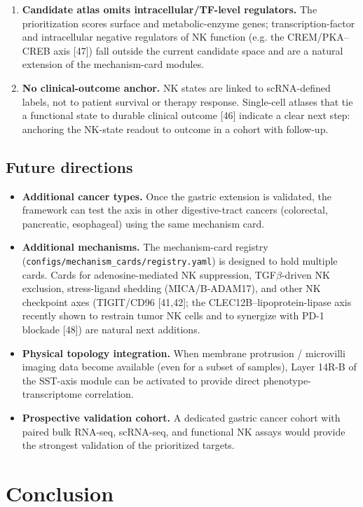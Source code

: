 \documentclass[modern,large,numbered,nocrop]{oup-authoring-template}
\begin{document}
\begin{enumerate}
\item \textbf{Candidate atlas omits intracellular/TF-level regulators.} The prioritization scores surface and metabolic-enzyme genes; transcription-factor and intracellular negative regulators of NK function (e.g. the CREM/PKA--CREB axis [47]) fall outside the current candidate space and are a natural extension of the mechanism-card modules.
\item \textbf{No clinical-outcome anchor.} NK states are linked to scRNA-defined labels, not to patient survival or therapy response. Single-cell atlases that tie a functional state to durable clinical outcome [46] indicate a clear next step: anchoring the NK-state readout to outcome in a cohort with follow-up.
\end{enumerate}

\subsection{Future directions}

\begin{itemize}
\item \textbf{Additional cancer types.} Once the gastric extension is validated, the framework can test the axis in other digestive-tract cancers (colorectal, pancreatic, esophageal) using the same mechanism card.
\item \textbf{Additional mechanisms.} The mechanism-card registry (\texttt{configs/mechanism\_cards/registry.yaml}) is designed to hold multiple cards. Cards for adenosine-mediated NK suppression, TGF$\beta$-driven NK exclusion, stress-ligand shedding (MICA/B-ADAM17), and other NK checkpoint axes (TIGIT/CD96 [41,42]; the CLEC12B--lipoprotein-lipase axis recently shown to restrain tumor NK cells and to synergize with PD-1 blockade [48]) are natural next additions.
\item \textbf{Physical topology integration.} When membrane protrusion / microvilli imaging data become available (even for a subset of samples), Layer 14R-B of the SST-axis module can be activated to provide direct phenotype-transcriptome correlation.
\item \textbf{Prospective validation cohort.} A dedicated gastric cancer cohort with paired bulk RNA-seq, scRNA-seq, and functional NK assays would provide the strongest validation of the prioritized targets.
\end{itemize}

\section{Conclusion}
\end{document}
